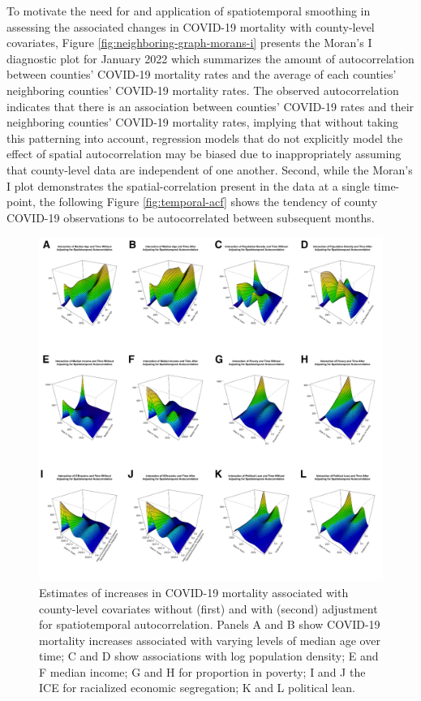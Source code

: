 \documentclass[
]{article}
\begin{document}
To motivate the need for and application of spatiotemporal smoothing in
assessing the associated changes in COVID-19 mortality with county-level
covariates, Figure \ref{fig:neighboring-graph-morans-i} presents the Moran's I
diagnostic plot for January 2022 which summarizes the amount of autocorrelation
between counties' COVID-19 mortality rates and the average of
each counties' neighboring counties' COVID-19 mortality rates. The observed
autocorrelation indicates that there is an association between counties'
COVID-19 rates and their neighboring counties' COVID-19 mortality rates, implying that
without taking this patterning into account, regression models that do not
explicitly model the effect of spatial autocorrelation may be biased due to
inappropriately assuming that county-level data are independent of one another. Second,
while the Moran's I plot demonstrates the spatial-correlation present in the data
at a single time-point, the following Figure \ref{fig:temporal-acf} shows the
tendency of county COVID-19 observations to be autocorrelated between subsequent
months.

\begin{figure}

{\centering \includegraphics[width=0.85\linewidth]{figures/spatiotemporal_panel_figure} 

}

\caption{Estimates of increases in COVID-19 mortality associated with county-level covariates without (first) and with (second) adjustment for spatiotemporal autocorrelation. Panels A and B show COVID-19 mortality increases associated with varying levels of median age over time; C and D show associations with log population density; E and F median income; G and H for proportion in poverty; I and J the ICE for racialized economic segregation; K and L political lean.}\label{fig:with-and-without-spatiotemporal-adjustment}
\end{figure}
\end{document}
